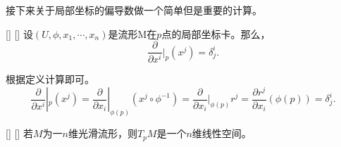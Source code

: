 \documentclass[UTF8]{ctexart}
\begin{document}
    接下来关于局部坐标的偏导数做一个简单但是重要的计算。
    
    \begin{ppt}
        []
        {}
        []
        []
        设$(U, \phi , x_1, \cdots , x_n)$是流形M在$p$点的局部坐标卡。那么，
        \[
            \frac{\partial}{\partial x^i} |_p (x^j) = \delta^i_{j}.
        \]
    \end{ppt}

    \begin{prf}
        
        
        
        

        根据定义计算即可。
        \[
        \frac{\partial}{\partial x^i} |_p (x^j)
        =
        \frac{\partial}{\partial x_i}|_{\phi(p)} (x^j \circ \phi^{-1} )
        =
        \frac{\partial}{\partial x_i}|_{\phi(p)} r^j
        =
        \frac{\partial r^j}{\partial x_i}(\phi(p))
        =
        \delta^i_{j}.
        \]
    \end{prf}
    
    \begin{thm}
        []
        {}
        []
        []
        若$M$为一$n$维光滑流形，则$T_p M$是一个$n$维线性空间。
    \end{thm}
    
\end{document}
